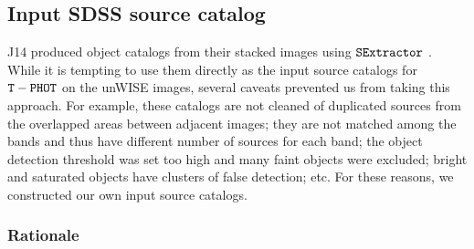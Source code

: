 \documentclass[apj,iop]{emulateapj}
\begin{document}



\subsection{Input SDSS source catalog} 
J14 produced object catalogs from their stacked images using $\tt SExtractor$ \citep[][]{Bertin1996}. While it is tempting to use them directly as the input source catalogs for $\tt T-PHOT$ on the unWISE images, several caveats prevented us from taking this approach. For example, these catalogs are not cleaned of duplicated sources from the overlapped areas between adjacent images; they are not matched among the bands and thus have different number of sources for each band; the object detection threshold was set too high and many faint objects were excluded; bright and saturated objects have clusters of false detection; etc. For these reasons, we constructed our own input source catalogs.

\subsubsection{Rationale}
\end{document}
